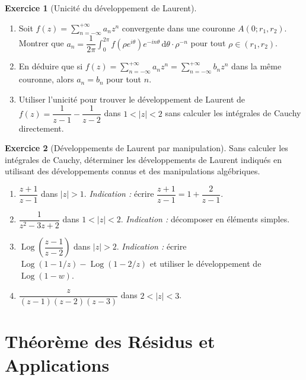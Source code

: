 \documentclass[12pt,a4paper,openany]{book}
\theoremstyle{definition}
\newtheorem{exercice}{Exercice}[chapter]
\theoremstyle{plain}
\theoremstyle{remark}
\DeclareMathOperator{\Log}{Log}
\newcommand{\dd}{\mathrm{d}}
\newcommand{\abs}[1]{\left|#1\right|}
\begin{document}
\begin{exercice}[Unicité du développement de Laurent]\label{exo:laurent-uniqueness}
\begin{enumerate}[label=\textbf{\alph*)}]
  \item Soit $f(z) = \displaystyle\sum_{n=-\infty}^{+\infty} a_n z^n$
        convergente dans une couronne $A(0; r_1, r_2)$. Montrer que
        $a_n = \dfrac{1}{2\pi}\displaystyle\int_0^{2\pi}
        f(\rho e^{i\theta})e^{-in\theta}\,\dd\theta \cdot \rho^{-n}$
        pour tout $\rho \in (r_1, r_2)$.
  \item En déduire que si $f(z) = \displaystyle\sum_{n=-\infty}^{+\infty}
        a_n z^n = \displaystyle\sum_{n=-\infty}^{+\infty} b_n z^n$ dans
        la même couronne, alors $a_n = b_n$ pour tout $n$.
  \item Utiliser l'unicité pour trouver le développement de Laurent de
        $f(z) = \dfrac{1}{z-1} - \dfrac{1}{z-2}$ dans $1 < \abs{z} < 2$
        sans calculer les intégrales de Cauchy directement.
\end{enumerate}
\end{exercice}

\begin{exercice}[Développements de Laurent par manipulation]\label{exo:laurent-manip}
Sans calculer les intégrales de Cauchy, déterminer les développements de
Laurent indiqués en utilisant des développements connus et des
manipulations algébriques.
\begin{enumerate}[label=\textbf{\alph*)}]
  \item $\dfrac{z+1}{z-1}$ dans $\abs{z} > 1$.
        \emph{Indication :} écrire $\dfrac{z+1}{z-1} = 1 + \dfrac{2}{z-1}$.
  \item $\dfrac{1}{z^2-3z+2}$ dans $1 < \abs{z} < 2$.
        \emph{Indication :} décomposer en éléments simples.
  \item $\Log\!\left(\dfrac{z-1}{z-2}\right)$ dans $\abs{z} > 2$.
        \emph{Indication :} écrire $\Log(1-1/z) - \Log(1-2/z)$ et
        utiliser le développement de $\Log(1-w)$.
  \item $\dfrac{z}{(z-1)(z-2)(z-3)}$ dans $2 < \abs{z} < 3$.
\end{enumerate}
\end{exercice}
\chapter{Théorème des Résidus et Applications}\label{chap:residus}
\end{document}
